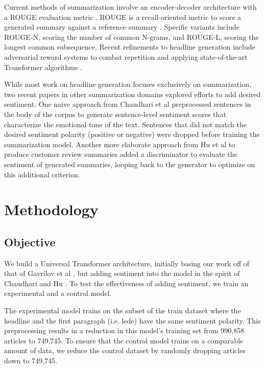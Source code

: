 \documentclass[11pt]{article}
\begin{document}
Current methods of summarization involve an encoder-decoder architecture \citep{rush2015neural} with a ROUGE evaluation metric \cite{Ayana2017}. ROUGE is a recall-oriented metric to score a generated summary against a reference summary \cite{lin-2004-rouge}. Specific variants include ROUGE-N, scoring the number of common N-grams, and ROUGE-L, scoring the longest common subsequence. Recent refinements to headline generation include adversarial reward systems to combat repetition \cite{DBLP:journals/corr/abs-1902-07110} and applying state-of-the-art Transformer algorithms \cite{DBLP:journals/corr/abs-1901-07786}.

While most work on headline generation focuses exclusively on summarization, two recent papers in other summarization domains explored efforts to add desired sentiment. One naive approach from Chaudhari et al \cite{DBLP:journals/corr/abs-1802-09426} preprocessed sentences in the body of the corpus to generate sentence-level sentiment scores that characterize the emotional tone of the text. Sentences that did not match the desired sentiment polarity (positive or negative) were dropped before training the summarization model. Another more elaborate approach from Hu et al \cite{DBLP:journals/corr/HuYLSX17} to produce customer review summaries added a discriminator to evaluate the sentiment of generated summaries, looping back to the generator to optimize on this additional criterion. 

\section{Methodology}

\subsection{Objective}
We build a Universal Transformer architecture, initially basing our work off of that of Gavrilov et al \cite{DBLP:journals/corr/abs-1901-07786}, but adding sentiment into the model in the spirit of Chaudhari \cite{DBLP:journals/corr/abs-1802-09426} and Hu \cite{DBLP:journals/corr/HuYLSX17}. To test the effectiveness of adding sentiment, we train an experimental and a control model.

The experimental model trains on the subset of the train dataset where the headline and the first paragraph (i.e. lede) have the same sentiment polarity. This preprocessing results in a reduction in this model's training set from 990,858 articles to 749,745. To ensure that the control model trains on a comparable amount of data, we reduce the control dataset by randomly dropping articles down to 749,745. 
\end{document}
